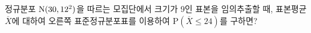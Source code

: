 \noindent\begin{minipage}[t]{0.58\linewidth}\vspace{0pt}\raggedright 정규분포 $\mathrm{N}(30{,}\mkern3mu\mathopen{}12^2)$을 따르는 모집단에서 크기가 9인 표본을 임의추출할 때, 표본평균 $\overline{X}$에 대하여 오른쪽 표준정규분포표를 이용하여 $\mathrm{P}(\overline{X}\le 24)$를 구하면?\end{minipage}\hfill\begin{minipage}[t]{0.4\linewidth}\vspace{0pt}\centering \resizebox{\ifdim\width>\linewidth\linewidth\else\width\fi}{!}{}\end{minipage}\par
{}
